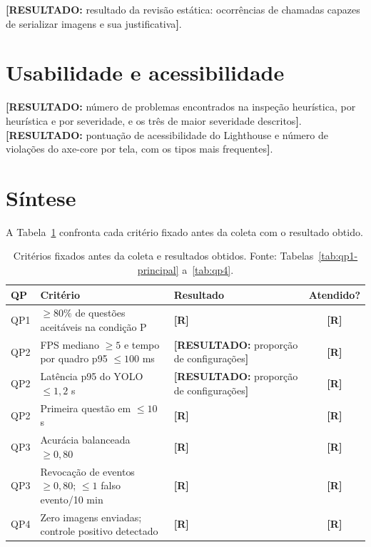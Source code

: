 \documentclass[portuguese,oneside]{tcc}
\newcommand{\resultado}[1]{\textcolor{red!70!black}{\textbf{[RESULTADO:} #1\textbf{]}}}
\newcommand{\rr}{\textcolor{red!70!black}{\textbf{[R]}}}
\begin{document}
\resultado{resultado da revisão estática: ocorrências de chamadas capazes de serializar imagens e sua justificativa}.

\section{Usabilidade e acessibilidade}

\resultado{número de problemas encontrados na inspeção heurística, por heurística e por severidade, e os três de maior severidade descritos}. \resultado{pontuação de acessibilidade do Lighthouse e número de violações do axe-core por tela, com os tipos mais frequentes}.

\section{Síntese}

A Tabela~\ref{tab:sintese-resultados} confronta cada critério fixado antes da coleta com o resultado obtido.

\begin{table}[htbp]
\centering
\caption{Critérios fixados antes da coleta e resultados obtidos. Fonte: Tabelas~\ref{tab:qp1-principal} a~\ref{tab:qp4}.}
\label{tab:sintese-resultados}
\small
\begin{tabularx}{\textwidth}{l >{\raggedright\arraybackslash}X >{\raggedright\arraybackslash}X c}
\toprule
QP & Critério & Resultado & Atendido? \\
\midrule
QP1 & $\ge 80\%$ de questões aceitáveis na condição P & \rr & \rr \\
QP2 & FPS mediano $\ge 5$ e tempo por quadro p95 $\le 100$ ms & \resultado{proporção de configurações} & \rr \\
QP2 & Latência p95 do YOLO $\le 1{,}2$ s & \resultado{proporção de configurações} & \rr \\
QP2 & Primeira questão em $\le 10$ s & \rr & \rr \\
QP3 & Acurácia balanceada $\ge 0{,}80$ & \rr & \rr \\
QP3 & Revocação de eventos $\ge 0{,}80$; $\le 1$ falso evento/10 min & \rr & \rr \\
QP4 & Zero imagens enviadas; controle positivo detectado & \rr & \rr \\
\bottomrule
\end{tabularx}
\end{table}

\end{document}
